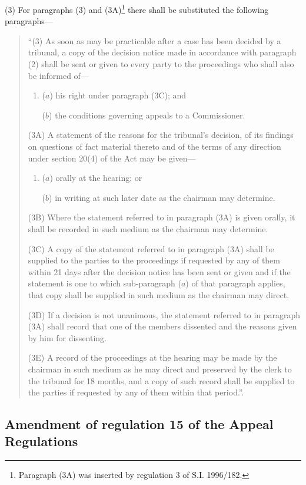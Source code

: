 \documentclass[12pt,a4paper]{article}
\begin{document}
(3) For paragraphs (3) and (3A)\footnote{\frenchspacing Paragraph (3A) was inserted by regulation 3 of S.I. 1996/182.} there shall be substituted the following paragraphs—
\begin{quotation}
“(3) As soon as may be practicable after a case has been decided by a tribunal, a copy of the decision notice made in accordance with paragraph (2) shall be sent or given to every party to the proceedings who shall also be informed of—
\begin{enumerate}\item[]
($a$) his right under paragraph (3C); and

($b$) the conditions governing appeals to a Commissioner.
\end{enumerate}

(3A) A statement of the reasons for the tribunal’s decision, of its findings on questions of fact material thereto and of the terms of any direction under section 20(4) of the Act may be given—
\begin{enumerate}\item[]
($a$) orally at the hearing; or

($b$) in writing at such later date as the chairman may determine.
\end{enumerate}

(3B) Where the statement referred to in paragraph (3A) is given orally, it shall be recorded in such medium as the chairman may determine.

(3C) A copy of the statement referred to in paragraph (3A) shall be supplied to the parties to the proceedings if requested by any of them within 21 days after the decision notice has been sent or given and if the statement is one to which sub-paragraph ($a$) of that paragraph applies, that copy shall be supplied in such medium as the chairman may direct.

(3D) If a decision is not unanimous, the statement referred to in paragraph (3A) shall record that one of the members dissented and the reasons given by him for dissenting.

(3E) A record of the proceedings at the hearing may be made by the chairman in such medium as he may direct and preserved by the clerk to the tribunal for 18 months, and a copy of such record shall be supplied to the parties if requested by any of them within that period.”.
\end{quotation}

\subsection[21. Amendment of regulation 15 of the Appeal Regulations]{Amendment of regulation 15 of the Appeal Regulations}
\end{document}
